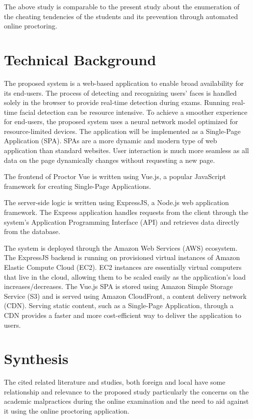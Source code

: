 The above study is comparable to the present study about the enumeration of the cheating tendencies of the students and its prevention through automated online proctoring.

\section{Technical Background}

The proposed system is a web-based application to enable broad availability for its end-users.
The process of detecting and recognizing users' faces is handled solely in the browser to provide real-time detection during exams.
Running real-time facial detection can be resource intensive.
To achieve a smoother experience for end-users, the proposed system uses a neural network model optimized for resource-limited devices.
The application will be implemented as a Single-Page Application (SPA).
SPAs are a more dynamic and modern type of web application than standard websites.
User interaction is much more seamless as all data on the page dynamically changes without requesting a new page.

The frontend of Proctor Vue is written using Vue.js, a popular JavaScript framework for creating Single-Page Applications.

The server-side logic is written using ExpressJS, a Node.js web application framework.
The Express application handles requests from the client through the system's Application Programming Interface (API) and retrieves data directly from the database.

The system is deployed through the Amazon Web Services (AWS) ecosystem.
The ExpressJS backend is running on provisioned virtual instances of Amazon Elastic Compute Cloud (EC2).
EC2 instances are essentially virtual computers that live in the cloud, allowing them to be scaled easily as the application's load increases/decreases.
The Vue.js SPA is stored using Amazon Simple Storage Service (S3) and is served using Amazon CloudFront, a content delivery network (CDN).
Serving static content, such as a Single-Page Application, through a CDN provides a faster and more cost-efficient way to deliver the application to users.


\section{Synthesis}

The cited related literature and studies, both foreign and local have some relationship and relevance to the proposed study particularly the concerns on the academic malpractices during the online examination and the need to aid against it using the online proctoring application.

